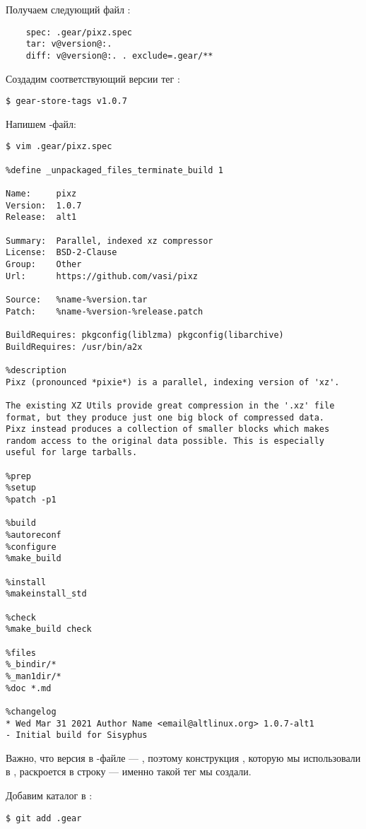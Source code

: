 Получаем следующий файл :
\begin{verbatim}
    spec: .gear/pixz.spec
    tar: v@version@:.
    diff: v@version@:. . exclude=.gear/**
\end{verbatim}

Создадим соответствующий версии тег :
\begin{verbatim}
$ gear-store-tags v1.0.7
\end{verbatim}

Напишем -файл:
\begin{verbatim}
$ vim .gear/pixz.spec

%define _unpackaged_files_terminate_build 1

Name:     pixz
Version:  1.0.7
Release:  alt1

Summary:  Parallel, indexed xz compressor
License:  BSD-2-Clause
Group:    Other
Url:      https://github.com/vasi/pixz

Source:   %name-%version.tar
Patch:    %name-%version-%release.patch

BuildRequires: pkgconfig(liblzma) pkgconfig(libarchive)
BuildRequires: /usr/bin/a2x

%description
Pixz (pronounced *pixie*) is a parallel, indexing version of 'xz'.

The existing XZ Utils provide great compression in the '.xz' file
format, but they produce just one big block of compressed data.
Pixz instead produces a collection of smaller blocks which makes
random access to the original data possible. This is especially
useful for large tarballs.

%prep
%setup
%patch -p1

%build
%autoreconf
%configure
%make_build

%install
%makeinstall_std

%check
%make_build check

%files
%_bindir/*
%_man1dir/*
%doc *.md

%changelog
* Wed Mar 31 2021 Author Name <email@altlinux.org> 1.0.7-alt1
- Initial build for Sisyphus

\end{verbatim}

Важно, что версия в -файле --- , поэтому конструкция ,
которую мы использовали в , раскроется в строку  ---
именно такой тег  мы создали.

Добавим каталог  в :
\begin{verbatim}
$ git add .gear
\end{verbatim}

